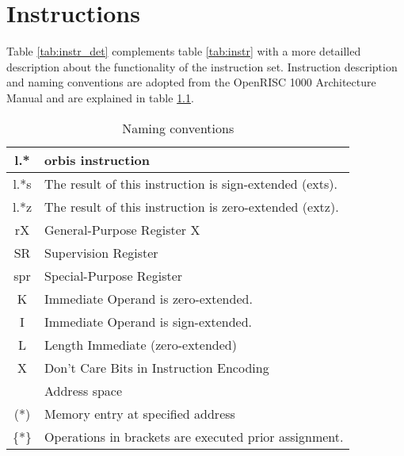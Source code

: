 
\chapter{Instructions}
Table \ref{tab:instr_det} complements table \ref{tab:instr} with a more detailled description about the functionality of the instruction set. Instruction description and naming conventions are adopted from the OpenRISC 1000 Architecture Manual and are explained in table \ref{tab:instr_conv}.
\begin{table}[htbp]
 \caption{Naming conventions}
 \label{tab:instr_conv}
 \centering\begin{tabular}{|c|l|} \hline
l.* & \gls{orbis} instruction \\ \hline

l.*s & The result of this instruction is sign-extended (exts). \\ \hline
l.*z & The result of this instruction is zero-extended (extz). \\ \hline
rX & General-Purpose Register X \\ \hline
SR & Supervision Register \\ \hline
spr & Special-Purpose Register \\ \hline
K & Immediate Operand is zero-extended. \\ \hline
I & Immediate Operand is sign-extended. \\ \hline
L & Length Immediate (zero-extended) \\ \hline
X & Don't Care Bits in Instruction Encoding \\ \hline
[*] & Address space \\ \hline
(*) & Memory entry at specified address \\ \hline
\{*\} & Operations in brackets are executed prior assignment. \\ \hline

 \end{tabular}
\end{table}

